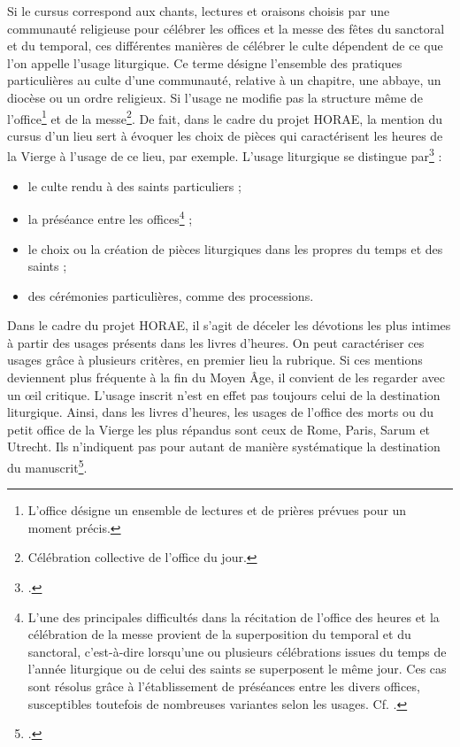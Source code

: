 \documentclass[a4paper,12pt,twoside]{book}
\begin{document}
	Si le cursus correspond aux chants, lectures et oraisons choisis par une communauté religieuse pour célébrer les offices et la messe des fêtes du sanctoral et du temporal, ces différentes manières de célébrer le culte dépendent de ce que l'on appelle l'usage liturgique. Ce terme désigne l’ensemble des pratiques particulières au culte d’une communauté, relative à un chapitre, une abbaye, un diocèse ou un ordre religieux. Si l'usage ne modifie pas la structure même de l'office\footnote{L'office désigne un ensemble de lectures et de prières prévues pour un moment précis.} et de la messe\footnote{Célébration collective de l'office du jour.}. De fait, dans le cadre du projet HORAE, la mention du cursus d'un lieu sert à évoquer les choix de pièces qui caractérisent les heures de la Vierge à l'usage de ce lieu, par exemple. L'usage liturgique se distingue par\footcite{usages_lit} : 
	\begin{itemize}
	    \item le culte rendu à des saints particuliers ;
	    \item la préséance entre les offices\footnote{L'une des principales difficultés dans la récitation de l’office des heures et la célébration de la messe provient de la superposition du temporal et du sanctoral, c’est-à-dire lorsqu’une ou plusieurs célébrations issues du temps de l'année liturgique ou de celui des saints se superposent le même jour. Ces cas sont résolus grâce à l’établissement de préséances entre les divers offices, susceptibles toutefois de nombreuses variantes selon les usages. Cf. \cite{preseance_offices}.} ;
	    \item le choix ou la création de pièces liturgiques dans les propres du temps et des saints ;
	    \item des cérémonies particulières, comme des processions.
	\end{itemize}
	
	Dans le cadre du projet HORAE, il s'agit de déceler les dévotions les plus intimes à partir des usages présents dans les livres d'heures. On peut caractériser ces usages grâce à plusieurs critères, en premier lieu la rubrique. Si ces mentions deviennent plus fréquente à la fin du Moyen Âge, il convient de les regarder avec un œil critique. L'usage inscrit n'est en effet pas toujours celui de la destination liturgique. Ainsi, dans les livres d’heures, les usages de l’office des morts ou du petit office de la Vierge les plus répandus sont ceux de Rome, Paris, Sarum et Utrecht. Ils n'indiquent pas pour autant de manière systématique la destination du manuscrit\footcite{usages_lit}. 
	
\end{document}
